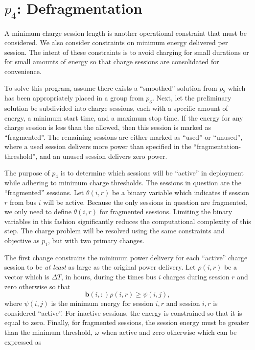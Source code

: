 \section{$p_4$: Defragmentation\label{sec:defragmentation}}
A minimum charge session length is another operational constraint that must be considered. We also consider constraints on minimum energy delivered per session. The intent of these constraints is to avoid charging for small durations or for small amounts of energy so that charge sessions are consolidated for convenience. 
\par To solve this program, assume there exists a ``smoothed'' solution from $p_2$ which has been appropriately placed in a group from $p_3$. Next, let the preliminary solution be subdivided into charge sessions, each with a specific amount of energy, a minimum start time, and a maximum stop time. If the energy for any charge session is less than the allowed, then this session is marked as ``fragmented''.  The remaining sessions are either marked as ``used'' or ``unused'', where a used session delivers more power than specified in the ``fragmentation-threshold'', and an unused session delivers zero power. 
\par The purpose of $p_4$ is to determine which sessions will be ``active'' in deployment while adhering to minimum charge thresholds. The sessions in question are the ``fragmented'' sessions.  Let $\theta(i,r)$ be a binary variable which indicates if session $r$ from bus $i$ will be active. Because the only sessions in question are fragmented, we only need to define $\theta(i,r)$ for fragmented sessions. Limiting the binary variables in this fashion significantly reduces the computational complexity of this step.  The charge problem will be resolved using the same constraints and objective as $p_1$, but with two primary changes.
\par The first change constrains the minimum power delivery for each ``active'' charge session to be {\it at least} as large as the original power delivery. Let $\rho(i,r)$ be a vector which is $\Delta T$, in hours, during the times bus $i$ charges during session $r$ and zero otherwise so that  
\begin{equation}\label{eqn:defragmentation:active}
	\mathbf{b}(i,:)\rho(i,r) \ge \psi(i,j),
\end{equation}
where $\psi(i,j)$ is the minimum energy for session $i,r$ and session $i,r$ is considered ``active''. For inactive sessions, the energy is constrained so that it is equal to zero. Finally, for fragmented sessions, the session energy must be greater than the minimum threshold, $\omega$ when active and zero otherwise which can be expressed as

